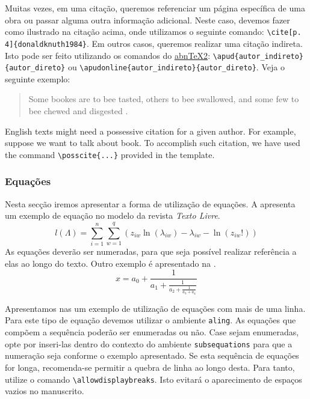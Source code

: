 \documentclass{textolivre}
\begin{document}
Muitas vezes, em uma citação, queremos referenciar um página específica de uma obra ou passar
alguma outra informação adicional. 
Neste caso, devemos fazer como ilustrado na citação acima, onde utilizamos o seguinte comando: \verb|\cite[p. 4]{donaldknuth1984}|.
Em outros casos, queremos realizar uma citação indireta. Isto pode ser feito utilizando os 
comandos do \href{https://github.com/abntex/abntex2}{abnTeX2}: \verb|\apud{autor_indireto}{autor_direto}| ou \verb|\apudonline{autor_indireto}{autor_direto}|.
Veja o seguinte exemplo: 
\begin{quote}
Some bookes are to bee tasted,
others to bee swallowed,
and some few to bee chewed and disgested .
\end{quote}

\begin{english}
English texts might need a possessive citation for a given author. For example,
suppose we want to talk about  book. To accomplish such citation, we have used the command \verb|\posscite{...}|
provided in the template.
\end{english}



\subsubsection{Equações}\label{sec-equacao}
Nesta secção iremos apresentar a forma de utilização de equações. A  apresenta um
exemplo de equação no modelo da revista \emph{Texto Livre}.
\begin{equation}
l(\Lambda)=\sum_{i=1}^{n} \sum_{w=1}^{q} (z_{i w} \ln (\lambda_{i w}) - \lambda_{i w} - \ln (z_{i w}!))
\label{eq-poisson}
\end{equation}
As equações deverão ser numeradas, para que seja possível realizar referência a elas ao longo do texto.
Outro exemplo é apresentado na .
\begin{equation}
  x = a_0 + \frac{1}{\displaystyle a_1 
          + \frac{1}{\displaystyle a_2 
          + \frac{1}{\displaystyle a_3 + a_4}}}
\label{eq-frac}
\end{equation}

Apresentamos nas  um exemplo de utilização de equações com mais de uma linha. 
Para este tipo de equação devemos utilizar o ambiente \texttt{aling}. 
As equações que compõem a sequência poderão ser enumeradas ou não. Case sejam enumeradas, opte por inseri-las dentro do contexto do ambiente 
\texttt{subsequations} para que a numeração seja conforme o exemplo apresentado.
Se esta sequência de equações for longa, recomenda-se permitir a quebra de linha ao longo desta. 
Para tanto, utilize o comando \verb|\allowdisplaybreaks|. Isto evitará o aparecimento de espaços vazios 
no manuscrito.
\end{document}

